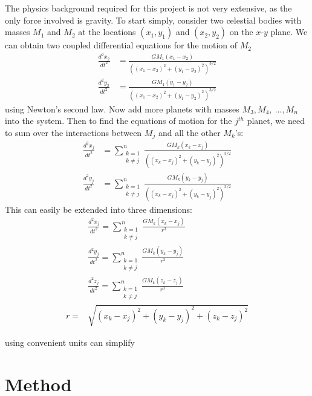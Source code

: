 \documentclass[prb,aps,twocolumn,showpacs,10pt]{revtex4-1}
\begin{document}
The physics background required for this project is not very extensive, as the only force involved is gravity. To start simply, consider two celestial bodies with masses $M_1$ and $M_2$ at the locations $(x_1,y_1)$ and $(x_2,y_2)$ on the $x$-$y$ plane. We can obtain two coupled differential equations for the motion of $M_2$
\begin{equation}
\begin{split}
\frac{d^2x_2}{dt^2} &= \frac{GM_1(x_1-x_2)}{((x_1-x_2)^2+(y_1-y_2)^2)^{3/2}}\\
\frac{d^2y_2}{dt^2} &= \frac{GM_1(y_1-y_2)}{((x_1-x_2)^2+(y_1-y_2)^2)^{3/2}}
\end{split}
\end{equation}
\noindent using Newton's second law. Now add more planets with masses $M_3, M_4, \ ..., M_n$ into the system. Then to find the equations of motion for the $j^{th}$ planet, we need to sum over the interactions between $M_j$ and all the other $M_k$'s:
\begin{equation}
\begin{split}
\frac{d^2x_j}{dt^2} &= \sum_{\substack{{k = 1}\\k \neq j}}^n \frac{GM_k(x_k-x_j)}{((x_k-x_j)^2+(y_k-y_j)^2)^{3/2}}\\
\frac{d^2y_j}{dt^2} &= \sum_{\substack{{k = 1}\\k \neq j}}^n \frac{GM_k(y_k-y_j)}{((x_k-x_j)^2+(y_k-y_j)^2)^{3/2}}
\end{split}
\end{equation}
\noindent This can easily be extended into three dimensions:
\begin{equation}
\begin{split}
&\frac{d^2x_j}{dt^2} = \sum_{\substack{{k = 1}\\k \neq j}}^n \frac{GM_k(x_k-x_j)}{r^3}\\
&\frac{d^2y_j}{dt^2} = \sum_{\substack{{k = 1}\\k \neq j}}^n \frac{GM_k(y_k-y_j)}{r^3}\\
&\frac{d^2z_j}{dt^2} = \sum_{\substack{{k = 1}\\k \neq j}}^n \frac{GM_k(z_k-z_j)}{r^3}\\
r = &\sqrt{(x_k-x_j)^2+(y_k-y_j)^2+(z_k-z_j)^2}
\end{split}
\end{equation}


using convenient units can simplify 

\section{Method}
\end{document}
